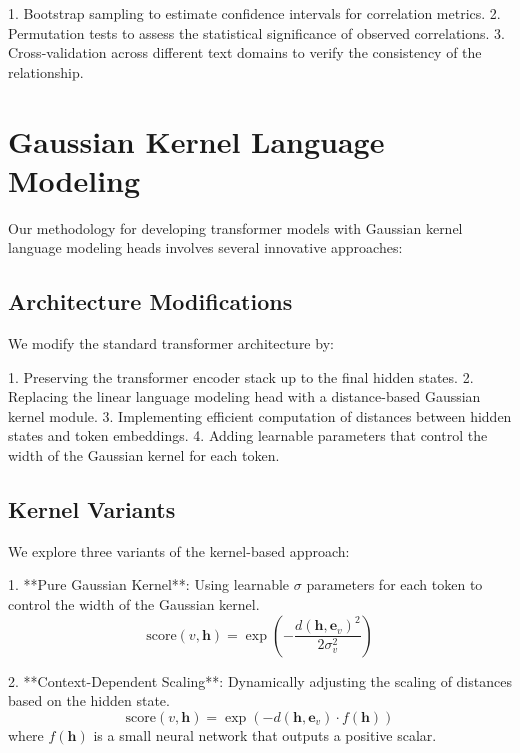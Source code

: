 1. Bootstrap sampling to estimate confidence intervals for correlation metrics.
2. Permutation tests to assess the statistical significance of observed correlations.
3. Cross-validation across different text domains to verify the consistency of the relationship.

\section{Gaussian Kernel Language Modeling}

Our methodology for developing transformer models with Gaussian kernel language modeling heads involves several innovative approaches:

\subsection{Architecture Modifications}

We modify the standard transformer architecture by:

1. Preserving the transformer encoder stack up to the final hidden states.
2. Replacing the linear language modeling head with a distance-based Gaussian kernel module.
3. Implementing efficient computation of distances between hidden states and token embeddings.
4. Adding learnable parameters that control the width of the Gaussian kernel for each token.

\subsection{Kernel Variants}

We explore three variants of the kernel-based approach:

1. **Pure Gaussian Kernel**: Using learnable $\sigma$ parameters for each token to control the width of the Gaussian kernel.
   \begin{equation}
       \text{score}(v, \mathbf{h}) = \exp\left(-\frac{d(\mathbf{h}, \mathbf{e}_v)^2}{2\sigma_v^2}\right)
   \end{equation}

2. **Context-Dependent Scaling**: Dynamically adjusting the scaling of distances based on the hidden state.
   \begin{equation}
       \text{score}(v, \mathbf{h}) = \exp(-d(\mathbf{h}, \mathbf{e}_v) \cdot f(\mathbf{h}))
   \end{equation}
   where $f(\mathbf{h})$ is a small neural network that outputs a positive scalar.

